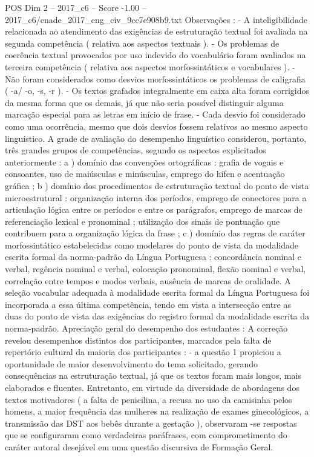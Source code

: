 \begin{textsample}{POS Dim 2 – 2017\_c6 – Score -1.00 – 2017\_c6/enade\_2017\_eng\_civ\_9cc7e908b9.txt}
Observações : - A inteligibilidade relacionada ao atendimento das exigências de estruturação textual foi avaliada na segunda competência ( relativa aos aspectos textuais ). - Os problemas de coerência textual provocados por uso indevido do vocabulário foram avaliados na terceira competência ( relativa aos aspectos morfossintáticos e vocabulares ). - Não foram considerados como desvios morfossintáticos os problemas de caligrafia ( -a/ -o, -s, -r ). - Os textos grafados integralmente em caixa alta foram corrigidos da mesma forma que os demais, já que não seria possível distinguir alguma marcação especial para as letras em início de frase. - Cada desvio foi considerado como uma ocorrência, mesmo que dois desvios fossem relativos ao mesmo aspecto linguístico.
A grade de avaliação do desempenho linguístico considerou, portanto, três grandes grupos de competências, segundo os aspectos explicitados anteriormente : a ) domínio das convenções ortográficas : grafia de vogais e consoantes, uso de maiúsculas e minúsculas, emprego do hífen e acentuação gráfica ; b ) domínio dos procedimentos de estruturação textual do ponto de vista microestrutural : organização interna dos períodos, emprego de conectores para a articulação lógica entre os períodos e entre os parágrafos, emprego de marcas de referenciação lexical e pronominal ; utilização dos sinais de pontuação que contribuem para a organização lógica da frase ; c ) domínio das regras de caráter morfossintático estabelecidas como modelares do ponto de vista da modalidade escrita formal da norma-padrão da Língua Portuguesa : concordância nominal e verbal, regência nominal e verbal, colocação pronominal, flexão nominal e verbal, correlação entre tempos e modos verbais, ausência de marcas de oralidade.
A seleção vocabular adequada à modalidade escrita formal da Língua Portuguesa foi incorporada a essa última competência, tendo em vista a intersecção entre as duas do ponto de vista das exigências do registro formal da modalidade escrita da norma-padrão.
Apreciação geral do desempenho dos estudantes : A correção revelou desempenhos distintos dos participantes, marcados pela falta de repertório cultural da maioria dos participantes : - a questão 1 propiciou a oportunidade de maior desenvolvimento do tema solicitado, gerando consequências na estruturação textual, já que os textos foram mais longos, mais elaborados e fluentes.
Entretanto, em virtude da diversidade de abordagens dos textos motivadores ( a falta de penicilina, a recusa no uso da camisinha pelos homens, a maior frequência das mulheres na realização de exames ginecológicos, a transmissão das DST aos bebês durante a gestação ), observaram -se respostas que se configuraram como verdadeiras paráfrases, com comprometimento do caráter autoral desejável em uma questão discursiva de Formação Geral.

\end{textsample}
